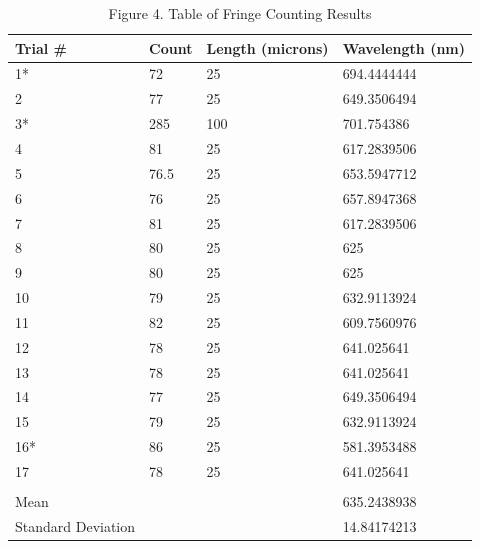 \documentclass{article}
\begin{document}
\begin{table}[!ht]
\centering
\captionsetup{labelformat=empty}
\caption{Figure 4. Table of Fringe Counting Results}
\begin{tabular}{llll}
Trial \#           & Count & Length (microns) & Wavelength (nm)  \\ 
\hline
1*                 & 72    & 25               & 694.4444444      \\ 
\hline
2                  & 77    & 25               & 649.3506494      \\ 
\hline
3*                 & 285   & 100              & 701.754386       \\ 
\hline
4                  & 81    & 25               & 617.2839506      \\ 
\hline
5                  & 76.5  & 25               & 653.5947712      \\ 
\hline
6                  & 76    & 25               & 657.8947368      \\ 
\hline
7                  & 81    & 25               & 617.2839506      \\ 
\hline
8                  & 80    & 25               & 625              \\ 
\hline
9                  & 80    & 25               & 625              \\ 
\hline
10                 & 79    & 25               & 632.9113924      \\ 
\hline
11                 & 82    & 25               & 609.7560976      \\ 
\hline
12                 & 78    & 25               & 641.025641       \\ 
\hline
13                 & 78    & 25               & 641.025641       \\ 
\hline
14                 & 77    & 25               & 649.3506494      \\ 
\hline
15                 & 79    & 25               & 632.9113924      \\ 
\hline
16*                & 86    & 25               & 581.3953488      \\ 
\hline
17                 & 78    & 25               & 641.025641       \\
                   &       &                  &                  \\
Mean               &       &                  & 635.2438938      \\ 
\hline
Standard Deviation &       &                  & 14.84174213     
\end{tabular}
\end{table}
\end{document}
